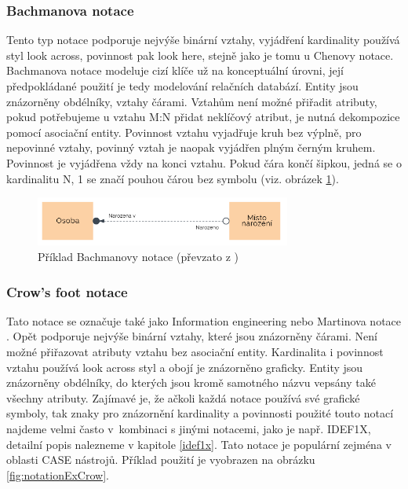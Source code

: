 \documentclass[czech,bachelor,public,dept460,male,oneside]{diploma}
\begin{document}
		\subsubsection{Bachmanova notace} \label{bachman}
		Tento typ notace podporuje nejvýše binární vztahy, vyjádření kardinality používá styl look across, povinnost pak look here, stejně jako je tomu u Chenovy notace. Bachmanova notace \cite{compErNotations} modeluje cizí klíče už na konceptuální úrovni, její předpokládané použití je tedy modelování relačních databází. Entity jsou znázorněny obdélníky, vztahy čárami. Vztahům není možné přiřadit atributy, pokud potřebujeme u vztahu M:N přidat neklíčový atribut, je nutná dekompozice pomocí asociační entity. Povinnost vztahu vyjadřuje kruh bez výplně, pro nepovinné vztahy, povinný vztah je naopak vyjádřen plným černým kruhem. Povinnost je vyjádřena vždy na konci vztahu. Pokud čára končí šipkou, jedná se o kardinalitu N, 1 se značí pouhou čárou bez symbolu (viz. obrázek \ref{fig:notationExBachman}).
		
		\begin{figure}[!h]
			\centering
			\includegraphics[width=0.75\textwidth]{Figures/NotationExBachman}
			\caption[Příklad Bachmanovy notace]{Příklad Bachmanovy notace (převzato z \cite{whatIsERD})}
			\label{fig:notationExBachman}
		\end{figure}
		
		\subsubsection{Crow's foot notace} \label{crowsfoot}
		Tato notace se označuje také jako Information engineering nebo Martinova notace \cite{compErNotations}. Opět podporuje nejvýše binární vztahy, které jsou znázorněny čárami. Není možné  přiřazovat atributy vztahu bez asociační entity. Kardinalita i povinnost vztahu používá look across styl a obojí je znázorněno graficky. Entity jsou znázorněny obdélníky, do kterých jsou kromě samotného názvu vepsány také všechny atributy. Zajímavé je, že ačkoli každá notace používá své grafické symboly, tak znaky pro znázornění kardinality a povinnosti použité touto notací najdeme velmi často v~kombinaci s jinými notacemi, jako je např. IDEF1X, detailní popis nalezneme v kapitole \ref{idef1x}. Tato notace je populární zejména v oblasti CASE nástrojů. Příklad použití je vyobrazen na obrázku \ref{fig:notationExCrow}.
		
\end{document}
